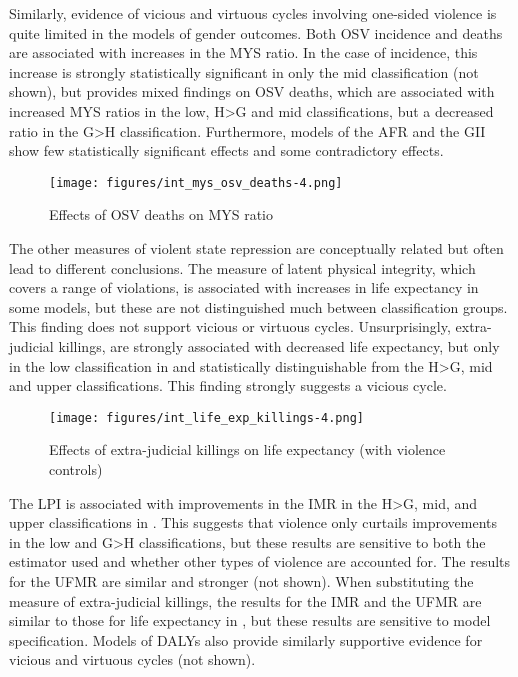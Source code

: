 \documentclass[12pt]{article}
\begin{document}
Similarly, evidence of vicious and virtuous cycles involving one-sided violence is quite limited in the models of gender outcomes. Both OSV incidence and deaths are associated with increases in the MYS ratio. In the case of incidence, this increase is strongly statistically significant in only the mid classification (not shown), but  provides mixed findings on OSV deaths, which are associated with increased MYS ratios in the low, H>G and mid classifications, but a decreased ratio in the G>H classification.
Furthermore, models of the AFR and the GII show few statistically significant effects and some contradictory effects.

\begin{figure}[!htb]
    \centering
    \caption{Effects of OSV deaths on MYS ratio}
    \label{int_mys_osv_deaths}
    \texttt{[image: figures/int\_mys\_osv\_deaths-4.png]}
\end{figure}

The other measures of violent state repression are conceptually related but often lead to different conclusions.
The measure of latent physical integrity, which covers a range of violations, is associated with increases in life expectancy in some models, but these are not distinguished much between classification groups.
This finding does not support vicious or virtuous cycles.
Unsurprisingly, extra-judicial killings, are strongly associated with decreased life expectancy, but only in the low classification in  and statistically distinguishable from the H>G, mid and upper classifications.
This finding strongly suggests a vicious cycle.

\begin{figure}[!htb]
    \centering
    \caption{Effects of extra-judicial killings on life expectancy (with violence controls)}
    \label{int_life_exp_killings}
    \texttt{[image: figures/int\_life\_exp\_killings-4.png]}
\end{figure}

The LPI is associated with improvements in the IMR in the H>G, mid, and upper classifications in .
This suggests that violence only curtails improvements in the low and G>H classifications, but these results are sensitive to both the estimator used and whether other types of violence are accounted for.
The results for the UFMR are similar and stronger (not shown).
When substituting the measure of extra-judicial killings, the results for the IMR and the UFMR are similar to those for life expectancy in , but these results are sensitive to model specification.
Models of DALYs also provide similarly supportive evidence for vicious and virtuous cycles (not shown).
\end{document}
